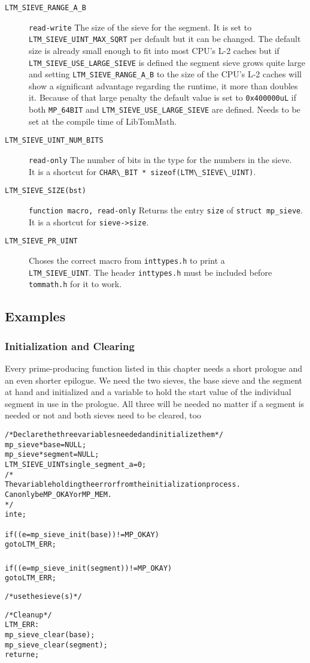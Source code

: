\documentclass[synpaper]{book}
\begin{document}
\begin{description}
\item[\texttt{LTM\_SIEVE\_RANGE\_A\_B}] \texttt{read-write} The size of the sieve for the segment. It is set to \texttt{LTM\_SIEVE\_UINT\_MAX\_SQRT} per default but it can be changed. The default size is already small enough to fit into most CPU's L-2 caches but if \texttt{LTM\_SIEVE\_USE\_LARGE\_SIEVE} is defined the segment sieve grows quite large and setting \texttt{LTM\_SIEVE\_RANGE\_A\_B} to the size of the CPU's L-2 caches will show a significant advantage regarding the runtime, it more than doubles it. Because of that large penalty the default value is set to \texttt{0x400000uL} if both \texttt{MP\_64BIT} and \texttt{LTM\_SIEVE\_USE\_LARGE\_SIEVE} are defined. Needs to be set at the compile time of LibTomMath.

\item[\texttt{LTM\_SIEVE\_UINT\_NUM\_BITS}] \texttt{read-only} The number of bits in the type for the numbers in the sieve.\\
It is a shortcut for \verb!CHAR\_BIT * sizeof(LTM\_SIEVE\_UINT)!.

\item[\texttt{LTM\_SIEVE\_SIZE(bst)}] \texttt{function macro, read-only} Returns the entry \texttt{size} of \texttt{struct mp\_sieve}. It is a shortcut for \verb!sieve->size!.

\item[\texttt{LTM\_SIEVE\_PR\_UINT}] Choses the correct macro from \texttt{inttypes.h} to print a\\
 \texttt{LTM\_SIEVE\_UINT}. The header \texttt{inttypes.h} must be included before\\
 \texttt{tommath.h} for it to work.
\end{description}


\subsection{Examples}\label{sec:spnexamples}
\subsubsection{Initialization and Clearing}
Every prime-producing function listed in this chapter needs a short prologue and an even shorter epilogue. We need the two sieves, the base sieve and the segment at hand and initialized and a variable to hold the start value of the individual segment in use in the prologue. All three will be needed no matter if a segment is needed or not and both sieves need to be cleared, too
\begin{alltt}
/* Declare the three variables needed and initialize them*/
mp_sieve *base = NULL;
mp_sieve *segment = NULL;
LTM_SIEVE_UINT single_segment_a = 0;
/* 
   The variable holding the error from the initialization process.
   Can only be MP_OKAY or MP_MEM.
*/
int e;

if ((e = mp_sieve_init(base) ) != MP_OKAY) {
   goto LTM_ERR;
}
if ((e = mp_sieve_init(segment) ) != MP_OKAY) {
   goto LTM_ERR;
}

/* use the sieve(s) */


/* Clean up */
LTM_ERR:
   mp_sieve_clear(base);
   mp_sieve_clear(segment);
   return e;
\end{alltt}
\end{document}
